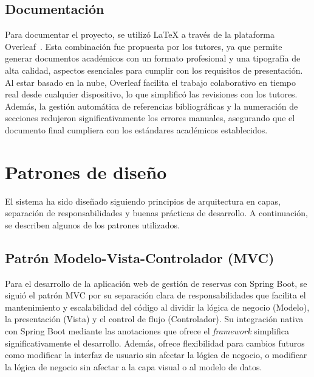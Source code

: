 \subsection{Documentación}\label{documentacion}
Para documentar el proyecto, se utilizó \LaTeX{} a través de la plataforma Overleaf~\cite{overleaf}. Esta combinación fue propuesta por los tutores, ya que permite generar documentos académicos con un formato profesional y una tipografía de alta calidad, aspectos esenciales para cumplir con los requisitos de presentación. Al estar basado en la nube, Overleaf facilita el trabajo colaborativo en tiempo real desde cualquier dispositivo, lo que simplificó las revisiones con los tutores. Además, la gestión automática de referencias bibliográficas y la numeración de secciones redujeron significativamente los errores manuales, asegurando que el documento final cumpliera con los estándares académicos establecidos.

\section{Patrones de diseño}\label{patron-de-diseño}

El sistema ha sido diseñado siguiendo principios de arquitectura en capas, separación de responsabilidades y buenas prácticas de desarrollo. A continuación, se describen algunos de los patrones utilizados.

\subsection{Patrón Modelo-Vista-Controlador (MVC)}\label{patron-modelo-vista-controlador}
Para el desarrollo de la aplicación web de gestión de reservas con Spring Boot, se siguió el patrón MVC por su separación clara de responsabilidades que facilita el mantenimiento y escalabilidad del código al dividir la lógica de negocio (Modelo), la presentación (Vista) y el control de flujo (Controlador). Su integración nativa con Spring Boot mediante las anotaciones que ofrece el \emph{framework} simplifica significativamente el desarrollo. Además, ofrece flexibilidad para cambios futuros como modificar la interfaz de usuario sin afectar la lógica de negocio, o modificar la lógica de negocio sin afectar a la capa visual o al modelo de datos.

